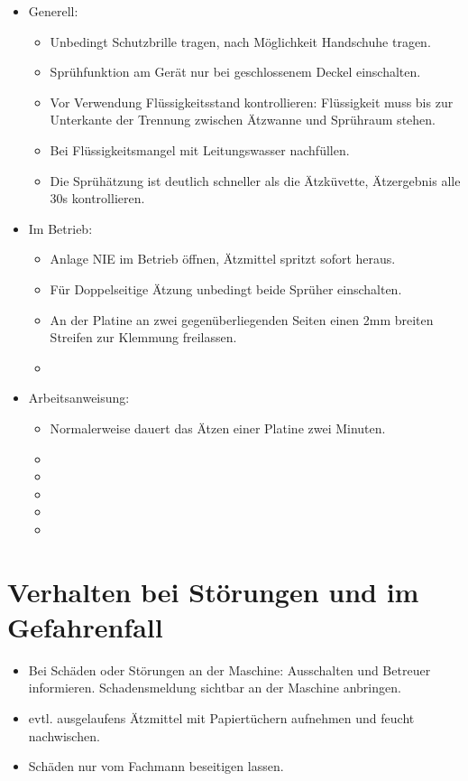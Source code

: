 \documentclass[fontsize=9pt]{scrartcl}
\newenvironment{smallitemize}{\begin{itemize}\itemsep -3pt}{\end{itemize}}
\begin{document}
\begin{itemize}
	\item Generell:
	\begin{smallitemize}
		\item Unbedingt Schutzbrille tragen, nach Möglichkeit Handschuhe tragen.
		\item Sprühfunktion am Gerät nur bei geschlossenem Deckel einschalten.
		\item Vor Verwendung Flüssigkeitsstand kontrollieren: Flüssigkeit muss bis zur Unterkante der Trennung zwischen Ätzwanne und Sprühraum stehen.
		\item Bei Flüssigkeitsmangel mit Leitungswasser nachfüllen.
		\item Die Sprühätzung ist deutlich schneller als die Ätzküvette, Ätzergebnis alle 30s kontrollieren.
		
	\end{smallitemize}
	\item Im Betrieb:
	\begin{smallitemize}
		\item Anlage NIE im Betrieb öffnen, Ätzmittel spritzt sofort heraus.
		\item Für Doppelseitige Ätzung unbedingt beide Sprüher einschalten.
		\item An der Platine an zwei gegenüberliegenden Seiten einen 2mm breiten Streifen zur Klemmung freilassen.
		\item 
		
	\end{smallitemize}
	\item Arbeitsanweisung:
	\begin{smallitemize}
		\item Normalerweise dauert das Ätzen einer Platine zwei Minuten.
		\item 
		\item 
		\item 
		\item 
		\item 
		\end{smallitemize}
\end{itemize}

\section{Verhalten bei Störungen und im Gefahrenfall}
\begin{smallitemize}
	\item Bei Schäden oder Störungen an der Maschine: Ausschalten und Betreuer informieren. Schadensmeldung sichtbar an der Maschine anbringen.
	\item evtl. ausgelaufens Ätzmittel mit Papiertüchern aufnehmen und feucht nachwischen.
	\item Schäden nur vom Fachmann beseitigen lassen.
\end{smallitemize}
\end{document}
